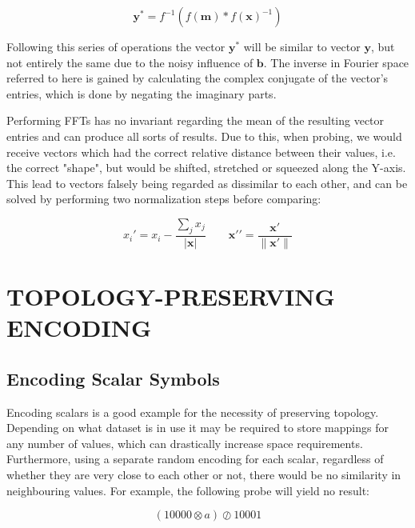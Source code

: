\documentclass[a4paper,twoside]{article}
\begin{document}
	\begin{equation}
	\pmb y^* = f^{-1}(f(\pmb m) * f(\pmb x)^{-1})
	\end{equation} 

Following this series of operations the vector $\pmb y^*$ will be similar to vector $\pmb y$, but not entirely the same due to the noisy influence of $\pmb b$. The inverse in Fourier space referred to here is gained by calculating the complex conjugate of the vector's entries, which is done by negating the imaginary parts.
		
	Performing FFTs has no invariant regarding the mean of the resulting vector entries and can produce all sorts of results.
Due to this, when probing, we would receive vectors which had the correct relative distance between their values, i.e.
the correct "shape", but would be shifted, stretched or squeezed along the Y-axis. This lead to vectors falsely being regarded as dissimilar to each other, and can be solved by performing two normalization steps before comparing:

	\begin{equation}\label{eq:norm1}
		{x_i}' = x_i - \frac{\sum_j x_j}{|{\pmb x}|}\qquad {\pmb x}{'}{'} = \frac{{\pmb x}'}{ \| {\pmb x}'\|}
	\end{equation}
	
	\section{TOPOLOGY-PRESERVING ENCODING}
	
	\subsection{Encoding Scalar Symbols}
	
	Encoding scalars is a good example for the necessity of preserving topology.
Depending on what dataset is in use it may be required to store mappings for any number of values, which can drastically increase space requirements.
Furthermore, using a separate random encoding for each scalar, regardless of whether they are very close to each other or not, there would be no similarity in neighbouring values.
For example, the following probe will yield no result:
	
	\begin{equation}
	(10000 \otimes a) \oslash 10001
	\end{equation}
	
\end{document}
